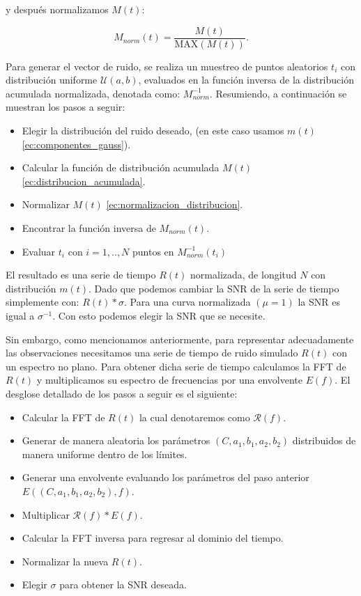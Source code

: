 \noindent y después normalizamos $M(t)$:

\begin{equation}\label{ec:normalizacion_distribucion}
  \displaystyle M_{norm}(t)= \dfrac{M(t)}{\mbox{MAX}(M(t))}.
\end{equation}

Para generar el vector de ruido, se realiza un muestreo de puntos aleatorios $t_{i}$ con distribución uniforme $\mathcal{U}(a,b)$, evaluados en la función inversa de la distribución acumulada normalizada, denotada como: $M^{-1}_{norm}$. Resumiendo, a continuación se muestran  los pasos a seguir:\\

\begin{itemize}
  \item Elegir la distribución del ruido deseado, (en este caso usamos $m(t)$ \ref{ec:componentes_gauss}).
  \item Calcular la función de distribución acumulada $M(t)$ \ref{ec:distribucion_acumulada}.
  \item Normalizar $M(t)$ \ref{ec:normalizacion_distribucion}.
  \item Encontrar la función inversa de $M_{norm}(t)$.
  \item Evaluar $t_{i}$ con $i=1,..,N$ puntos en $M^{-1}_{norm}(t_{i})$
\end{itemize}


El resultado es una serie de tiempo $R(t)$ normalizada, de longitud $N$ con distribución $m(t)$. Dado que podemos cambiar la SNR de la serie de tiempo simplemente con: $R(t)*\sigma$. Para una curva normalizada $(\mu=1)$ la SNR es igual a $\sigma^{-1}$. Con esto podemos elegir la SNR que se necesite.

Sin embargo, como mencionamos anteriormente, para representar adecuadamente las observaciones necesitamos una serie de tiempo de ruido simulado $R(t)$ con un espectro no plano. Para obtener dicha serie de tiempo calculamos la FFT de $R(t)$ y multiplicamos su espectro de frecuencias por una envolvente $E(f)$. El desglose detallado de los pasos a seguir es el siguiente:

\begin{itemize}
  \item Calcular la FFT de $R(t)$ la cual denotaremos como $\mathcal{R}(f)$.
  \item Generar de manera aleatoria los parámetros $(C,a_{1},b_{1},a_{2},b_{2})$ distribuidos de manera uniforme dentro de los límites.
  \item Generar una envolvente evaluando los parámetros del paso anterior $E((C,a_{1},b_{1},a_{2},b_{2}),f)$.
  \item Multiplicar $\mathcal{R}(f)*E(f)$.
  \item Calcular la FFT inversa para regresar al dominio del tiempo.
  \item Normalizar la nueva $R(t)$.
  \item Elegir $\sigma$ para obtener la SNR deseada.
\end{itemize}

